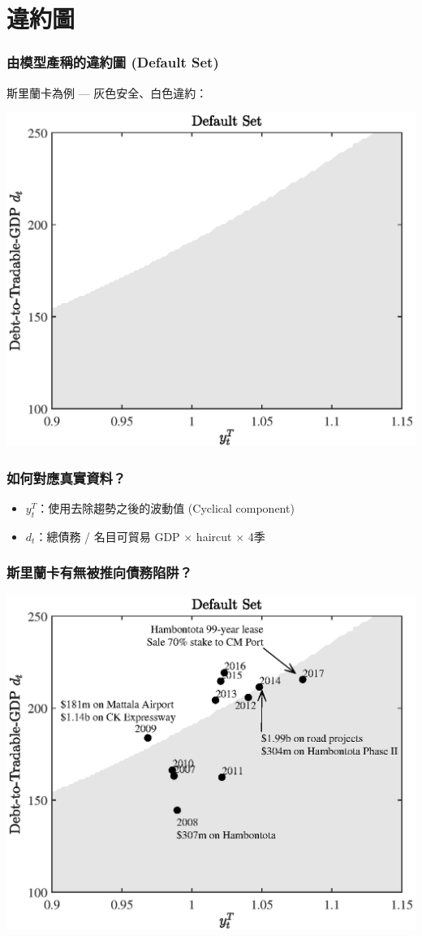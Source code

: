 \documentclass[mathserif]{beamer}
\begin{document}
    \section{違約圖}
    \begin{frame}
        \frametitle{由模型產稱的違約圖 (Default Set)}
        斯里蘭卡為例 --- 灰色安全、白色違約：
        \begin{center}
        \includegraphics[height = 0.8\textheight]{fig/default_set_sri_trad_hp.eps}
        \end{center}
    \end{frame}

    \begin{frame}
        \frametitle{如何對應真實資料？}
        \begin{itemize}
            \item $y^T_t$：使用去除趨勢之後的波動值 (Cyclical component)
            \item $d_t$：總債務 / 名目可貿易 GDP $\times$ haircut $\times$ 4季
        \end{itemize}
    \end{frame}

    \begin{frame}
        \frametitle{斯里蘭卡有無被推向債務陷阱？}
        \centering
        \includegraphics[width = 0.8 \textwidth]{fig/default_set_sri_trad_hp_with_china.eps}
    \end{frame}
\end{document}
